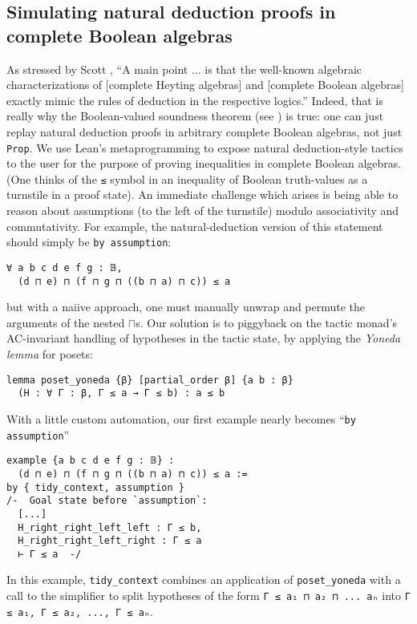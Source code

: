 \documentclass[sigplan,10pt,review]{acmart}
\newcommand{\lil}{\lstinline}
\theoremstyle{definition}
\begin{document}
\subsection{Simulating natural deduction proofs in complete Boolean algebras} \label{subsect:natded}
As stressed by Scott \cite{scott2008algebraic}, ``A main point ... is that the well-known algebraic characterizations of [complete Heyting algebras] and [complete Boolean algebras] exactly mimic the rules of deduction in the respective logics.''
Indeed, that is really why the Boolean-valued soundness theorem (see ) is true: one can just replay natural deduction proofs in arbitrary complete Boolean algebras, not just \lil{Prop}. We use Lean's metaprogramming to expose natural deduction-style tactics to the user for the purpose of proving inequalities in complete Boolean algebras. (One thinks of the \lil{≤} symbol in an inequality of Boolean truth-values as a turnstile in a proof state). An immediate challenge which arises is being able to reason about assumptions (to the left of the turnstile) modulo associativity and commutativity. For example, the natural-deduction version of this statement should simply be \lil{by assumption}:
\begin{lstlisting}
∀ a b c d e f g : 𝔹,
  (d ⊓ e) ⊓ (f ⊓ g ⊓ ((b ⊓ a) ⊓ c)) ≤ a
\end{lstlisting}
but with a naiive approach, one must manually unwrap and permute the arguments of the nested \(\sqcap\)s. Our solution is to piggyback on the tactic monad's AC-invariant handling of hypotheses in the tactic state, by applying the \emph{Yoneda lemma} for posets:
\label{poset-yoneda}
\begin{lstlisting}
lemma poset_yoneda {β} [partial_order β] {a b : β}
  (H : ∀ Γ : β, Γ ≤ a → Γ ≤ b) : a ≤ b
\end{lstlisting}
With a little custom automation, our first example nearly becomes ``\lil{by assumption}''
\begin{lstlisting}
example {a b c d e f g : 𝔹} :
  (d ⊓ e) ⊓ (f ⊓ g ⊓ ((b ⊓ a) ⊓ c)) ≤ a :=
by { tidy_context, assumption }
/-  Goal state before `assumption`:
  [...]
  H_right_right_left_left : Γ ≤ b,
  H_right_right_left_right : Γ ≤ a
  ⊢ Γ ≤ a  -/
\end{lstlisting}
In this example, \lil{tidy_context} combines an application of \lil{poset_yoneda} with a call to the simplifier to split hypotheses of the form \lstinline{Γ ≤ a₁ ⊓ a₂ ⊓ ... aₙ} into \lstinline{Γ ≤ a₁, Γ ≤ a₂, ..., Γ ≤ aₙ}.
\end{document}
